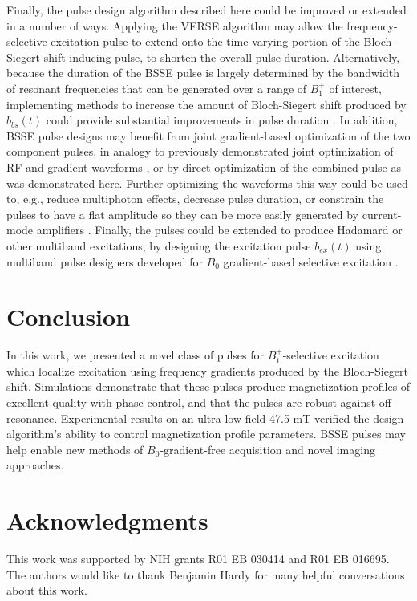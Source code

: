 \documentclass{article}
\newcommand{\bbst}{b_{bs}(t)}
\begin{document}
\par Finally, the pulse design algorithm described here could be improved or extended in a number of ways. 
Applying the VERSE algorithm \cite{Hargreaves2004Variable-rateSequences} may allow the frequency-selective excitation pulse to extend onto the time-varying portion of the Bloch-Siegert shift inducing pulse, 
to shorten the overall pulse duration. 
Alternatively, because the duration of the BSSE pulse is largely determined by the bandwidth of resonant frequencies that can be generated over a range of $B_1^+$ of interest, 
implementing methods to increase the amount of Bloch-Siegert shift produced by $\bbst$ could provide substantial improvements in pulse duration \cite{MM2012RFMapping, Duan2013ImprovedShift}. 
In addition, BSSE pulse designs may benefit from joint gradient-based optimization of the two component pulses, 
in analogy to previously demonstrated joint optimization of RF and gradient waveforms \cite{Luo2020JointMRI}, 
or by direct optimization of the combined pulse as was demonstrated here.
Further optimizing the waveforms this way could be used to, e.g., 
reduce multiphoton effects, decrease pulse duration, 
or constrain the pulses to have a flat amplitude so they can be more easily generated by 
current-mode amplifiers \cite{Bolding2022Low-costImaging}. 
Finally, the pulses could be extended to produce Hadamard or other multiband excitations,
by designing the excitation pulse $b_{ex}(t)$ using multiband pulse designers developed
for $B_0$ gradient-based selective excitation \cite{ Cunningham1999MethodTransform, Sharma2016Root-flippedPulses, Ma2017MinimumImaging}.

\section{Conclusion}
In this work, we presented a novel class of pulses for $B_1^+$-selective excitation which localize excitation using frequency gradients produced by the Bloch-Siegert shift. Simulations demonstrate that these pulses produce magnetization profiles of excellent quality with phase control, and that the pulses are robust against off-resonance. Experimental results on an ultra-low-field 47.5 mT verified the design algorithm's ability to control magnetization profile parameters. BSSE pulses may help enable new methods of $B_0$-gradient-free acquisition and novel imaging approaches. 

\section{Acknowledgments}
This work was supported by NIH grants R01 EB 030414 and R01 EB 016695. The authors would like to thank Benjamin Hardy for many helpful conversations about this work.
\end{document}
